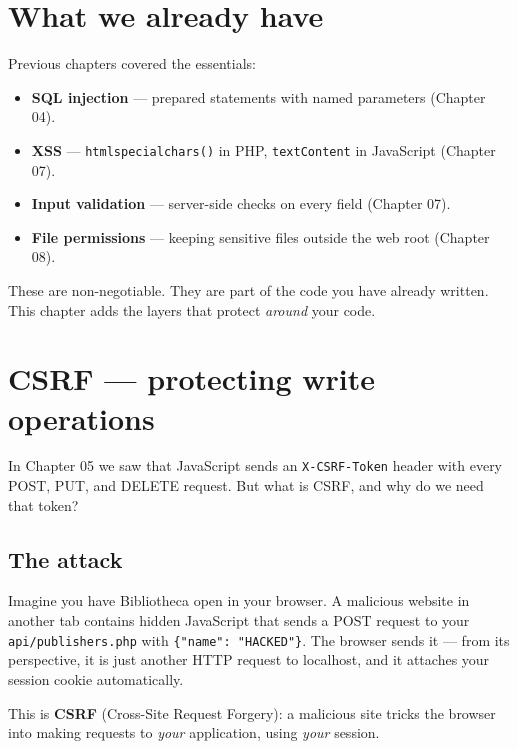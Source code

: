 \documentclass[11pt,a4paper,oneside]{book}
\providecommand{\tightlist}{%
  \setlength{\itemsep}{0pt}\setlength{\parskip}{0pt}}
\begin{document}
\hypertarget{what-we-already-have}{%
\section{What we already have}\label{what-we-already-have}}

Previous chapters covered the essentials:

\begin{itemize}
\tightlist
\item
  \textbf{SQL injection} --- prepared statements with named
  parameters (Chapter 04).
\item
  \textbf{XSS} --- \texttt{htmlspecialchars()} in PHP,
  \texttt{textContent} in JavaScript (Chapter 07).
\item
  \textbf{Input validation} --- server-side checks on every field
  (Chapter 07).
\item
  \textbf{File permissions} --- keeping sensitive files outside
  the web root (Chapter 08).
\end{itemize}

These are non-negotiable. They are part of the code you have
already written. This chapter adds the layers that protect
\emph{around} your code.

\hypertarget{csrf-protecting-write-operations}{%
\section{CSRF --- protecting write
operations}\label{csrf-protecting-write-operations}}

In Chapter 05 we saw that JavaScript sends an
\texttt{X-CSRF-Token} header with every POST, PUT, and DELETE
request. But what is CSRF, and why do we need that token?

\hypertarget{the-attack}{%
\subsection{The attack}\label{the-attack}}

Imagine you have Bibliotheca open in your browser. A malicious
website in another tab contains hidden JavaScript that sends a
POST request to your \texttt{api/publishers.php} with
\texttt{\{"name":\ "HACKED"\}}. The browser sends it --- from its
perspective, it is just another HTTP request to localhost, and it
attaches your session cookie automatically.

This is \textbf{CSRF} (Cross-Site Request Forgery): a malicious
site tricks the browser into making requests to \emph{your}
application, using \emph{your} session.
\end{document}
